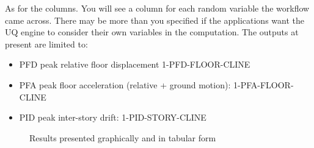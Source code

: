 As for the columns. You will see a column for each random variable the
workflow came across. There may be more than you specified if the
applications want the UQ engine to consider their own variables in the
computation. The outputs at present are limited to:

\begin{itemize}
    \item PFD peak relative floor displacement 1-PFD-FLOOR-CLINE
    \item PFA peak floor acceleration (relative + ground motion): 1-PFA-FLOOR-CLINE
    \item PID peak inter-story drift: 1-PID-STORY-CLINE
\end{itemize}

\begin{figure}[!htbp]
  \caption{Results presented graphically and in tabular form}
  \label{fig:results_data}
\end{figure}
